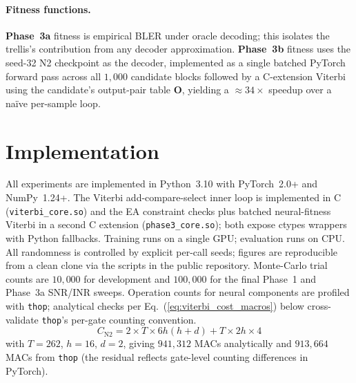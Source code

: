 \documentclass[conference]{IEEEtran}
\begin{document}
\paragraph*{Fitness functions.}
\textbf{Phase~3a} fitness is empirical BLER under oracle decoding; this
isolates the trellis's contribution from any decoder approximation.
\textbf{Phase~3b} fitness uses the seed-32 N2 checkpoint as the decoder,
implemented as a single batched PyTorch forward pass across all $1{,}000$
candidate blocks followed by a C-extension Viterbi using the candidate's
output-pair table $\mathbf{O}$, yielding a $\approx34\times$ speedup
over a naïve per-sample loop.

\section{Implementation}

All experiments are implemented in Python~3.10 with PyTorch~2.0+ and
NumPy~1.24+.  The Viterbi add-compare-select inner loop is implemented
in C (\texttt{viterbi\_core.so}) and the EA constraint checks plus
batched neural-fitness Viterbi in a second C extension
(\texttt{phase3\_core.so}); both expose ctypes wrappers with
Python fallbacks.  Training runs on a single GPU; evaluation runs on
CPU.  All randomness is controlled by explicit per-call seeds; figures
are reproducible from a clean clone via the scripts in the public
repository.  Monte-Carlo trial counts are $10{,}000$ for development and
$100{,}000$ for the final Phase~1 and Phase~3a SNR/INR sweeps.  Operation
counts for neural components are profiled with \texttt{thop}; analytical
checks per Eq.~(\ref{eq:viterbi_cost_macros}) below cross-validate
\texttt{thop}'s per-gate counting convention.
\begin{equation}
  C_{\mathrm{N2}} = 2 \times T \times 6h(h{+}d) + T \times 2h \times 4
  \label{eq:viterbi_cost_macros}
\end{equation}
with $T{=}262$, $h{=}16$, $d{=}2$, giving $941{,}312$ MACs analytically
and $913{,}664$ MACs from \texttt{thop} (the residual reflects gate-level
counting differences in PyTorch).
\end{document}
